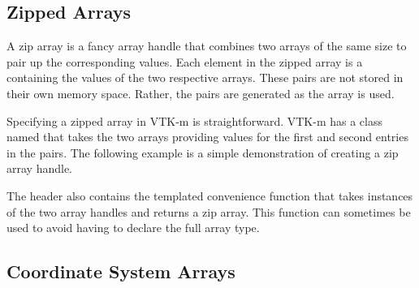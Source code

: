 
\subsection{Zipped Arrays}
\label{sec:ZippedArrays}


A zip array is a fancy array handle that combines two arrays of the same
size to pair up the corresponding values. Each element in the zipped array
is a  containing the values of the two respective arrays. These
pairs are not stored in their own memory space. Rather, the pairs are
generated as the array is used.

Specifying a zipped array in VTK-m is straightforward. VTK-m has a class
named  that takes the two arrays providing values
for the first and second entries in the pairs. The following example is a
simple demonstration of creating a zip array handle.


The  header also contains the
templated convenience function  that takes
instances of the two array handles and returns a zip array. This function
can sometimes be used to avoid having to declare the full array type.



\subsection{Coordinate System Arrays}
\label{sec:CoordinateSystemArrays}







